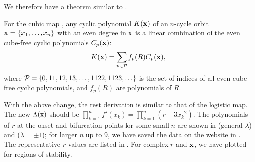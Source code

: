 \documentclass[twocolumn]{revtex4-1}
\begin{document}
We therefore have a theorem similar to .
%
%
\begin{theorem}
  For the cubic map ,
  any cyclic polynomial $K(\mathbf{x})$ of
  an $n$-cycle orbit
  $\mathbf{x} = \{x_1, \ldots, x_n\}$
  with an even degree in $\mathbf{x}$
  is a linear combination of
the even cube-free cyclic polynomials $C_p(\mathbf{x})$:
\[
  K(\mathbf{x}) = \sum_{p \in \mathcal P} f_p(R) C_p(\mathbf{x}),
\]
  where $\mathcal P = \{0, 11, 12, 13, \ldots, 1122, 1123, \ldots \}$ is
  the set of indices of all even cube-free cyclic polynomials,
  and $f_p(R)$ are polynomials of $R$.
  \label{thm:cubfree}
\end{theorem}






With the above change, the rest derivation is similar to that of the logistic map.
The new $\Lambda(\mathbf{x})$ should be
$\prod_{k=1}^n f'(x_k) = \prod_{k=1}^n (r - 3 {x_k}^2)$.
%
The polynomials of $r$
  at the onset and bifurcation points
for some small $n$ are shown in  (general $\lambda$)
and  ($\lambda = \pm1$);
for larger $n$ up to 9,
we have saved the data on the website in .
%
The representative $r$ values are listed in .
%
For complex $r$ and $\mathbf{x}$,
we have plotted  for regions of stability.
\end{document}
